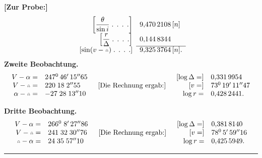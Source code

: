 \clearpage
{}
\noindent\hspace*{\parindent}\textbf{[Zur Probe:]}
\[
\begin{array}{rl}
{}\left[\dfrac\theta{\sin i}\;\text{. . . .}\right]&9{,}470\,2108\,[n]\\[3pt]
{}\left[\dfrac r\Delta\;\text{. . . .}\right]&0{,}144\,8344\\\cline{2-2}
{}[\sin(v-\AstNode)\;\text{. . . .}]&9{,}325\,3764\,[n].
\end{array}
\]
\noindent\hspace*{\parindent}\textbf{Zweite Beobachtung.}
\[
\begin{array}{rl}
V-\alpha=&247^0\,46'\,15''65\\
V-\AstNode=&220\;18\;2''55\\
\alpha-\AstNode=&-27\;28\;13''10
\end{array}
\quad\text{[Die Rechnung ergab:]}\quad
\begin{array}{rl}
{}[\log\Delta=]&0{,}331\,9954\\
{}[v=]&73^0\,19'\,11''47\\
\log r=&0{,}428\,2441.
\end{array}
\]
\noindent{\small [S. 2]}\par
\noindent\hspace*{\parindent}\textbf{Dritte Beobachtung.}
\[
\begin{array}{rl}
V-\alpha=&266^0\;8'\,27''86\\
V-\AstNode=&241\;32\;30''76\\
\AstNode-\alpha=&24\;35\;57''10
\end{array}
\quad\text{[Die Rechnung ergab:]}\quad
\begin{array}{rl}
{}[\log\Delta=]&0{,}381\,8140\\
{}[v=]&78^0\,5'\,59''16\\
\log r=&0{,}425\,5949.
\end{array}
\]
\begin{center}\rule{.20\linewidth}{.3pt}\end{center}
\clearpage
\endgroup
